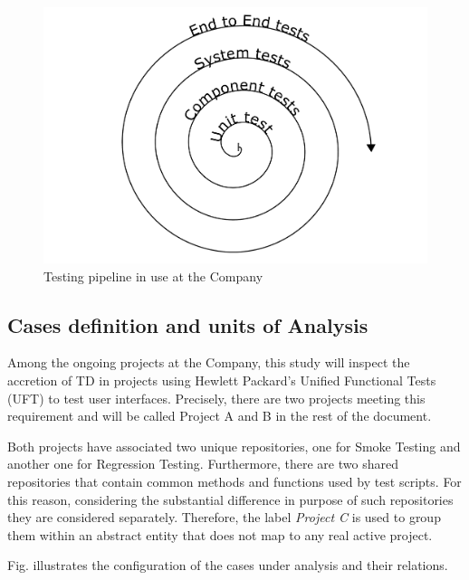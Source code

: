 
\begin{figure}[hbt]
    \centering
    \includegraphics[width=\textwidth]{figure/testing_pipeline.pdf}
    \caption{Testing pipeline in use at the Company}
    \label{fig:testing_pipeline}
\end{figure}

\subsection{Cases definition and units of Analysis}

Among the ongoing projects at the Company, this study will inspect the accretion of TD in projects using Hewlett Packard's Unified Functional Tests (UFT) to test user interfaces. Precisely, there are two projects meeting this requirement and will be called Project A and B in the rest of the document.

Both projects have associated two unique repositories, one for Smoke Testing and another one for Regression Testing. Furthermore, there are two shared repositories that contain common methods and functions used by test scripts. For this reason, considering the substantial difference in purpose of such repositories they are considered separately. Therefore, the label \textit{Project C} is used to group them within an abstract entity that does not map to any real active project.

Fig.  illustrates the configuration of the cases under analysis and their relations.

